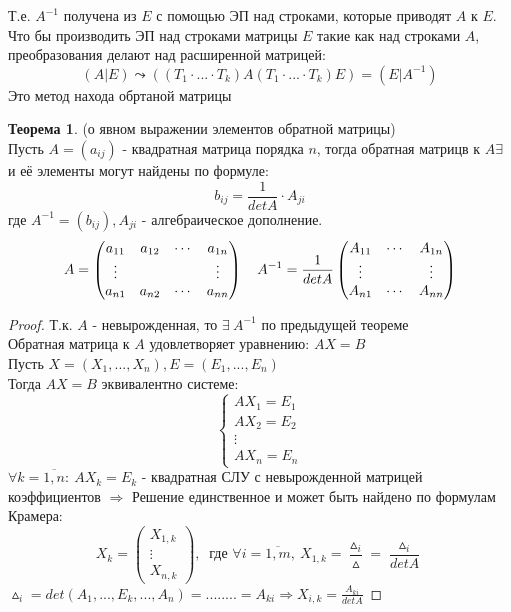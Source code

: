 \documentclass[a4paper, 12pt]{article}
\theoremstyle{definition}
\newtheorem*{theorem}{Теорема}
\begin{document}
  Т.е. $A^{-1}$ получена из $E$ с помощью ЭП над строками, которые приводят $A$ к $E$. \\
  Что бы производить ЭП над строками матрицы $E$ такие как над строками $A$, преобразования делают над расширенной матрицей:
  $$(A|E) \leadsto ((T_1 \cdot ... \cdot T_k)A(T_1 \cdot ... \cdot T_k)E) = (E|A^{-1})$$ 
  Это метод находа обртаной матрицы
  \begin{theorem}
    (о явном выражении элементов обратной матрицы) \\
    Пусть $A = (a_{ij})$ - квадратная матрица порядка $n$, тогда обратная матрицв к $A \exists \ $ и её элементы могут найдены по формуле: 
    $$b_{ij} = \frac{1}{detA} \cdot A_{ji}$$
    где $A^{-1} = (b_{ij}), A_{ji}$ - алгебраическое дополнение. 
    $$A = \begin{pmatrix}
      a_{11} & a_{12} & \cdots & a_{1n} \\
      \vdots & \null & \null & \vdots \\
      a_{n1} & a_{n2} & \cdots & a_{nn} 
    \end{pmatrix} \ \ \ A^{-1} = \frac{1}{detA} \begin{pmatrix}
      A_{11} & \cdots & A_{1n} \\
      \vdots  & \null & \vdots \\
      A_{n1} &  \cdots & A_{nn} 
    \end{pmatrix}$$    
  \end{theorem} 
  \begin{proof}
    Т.к. $A$ - невырожденная, то $\exists \ A^{-1}$ по предыдущей теореме \\
    Обратная матрица к $A$ удовлетворяет уравнению: $AX=B$ \\
    Пусть $X = (X_1,...,X_n), E = (E_1,...,E_n)$ \\
    Тогда $AX = B$ эквивалентно системе:
    $$\begin{cases}
      AX_1 = E_1 \\
      AX_2 = E_2 \\
      \vdots \\
      AX_n = E_n
    \end{cases}$$    
    $\forall k = \overline{1,n}: \ AX_k = E_k $ - квадратная СЛУ с невырожденной матрицей коэффициентов $\Longrightarrow $ Решение единственное и может быть найдено по формулам Крамера:
    $$X_k = \begin{pmatrix}
    X_{1,k} \\ \vdots \\ X_{n,k} \end{pmatrix}, \  \text{ где } \forall i = \overline{1,m}, \ X_{1,k} = \frac{\vartriangle_i}{\vartriangle} = \frac{\vartriangle_i}{detA}$$
    $\vartriangle_i = det(A_1,...,E_k,...,A_n) = ........ = A_{ki} \Longrightarrow X_{i,k} = \frac{A_{ki}}{detA}$ 
  \end{proof} 
  \newpage
\end{document}
